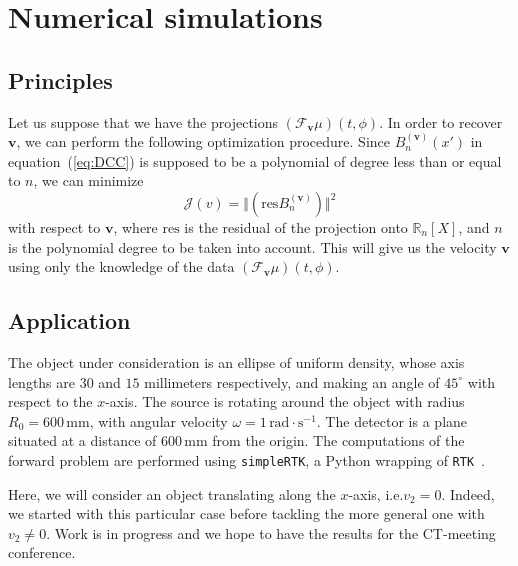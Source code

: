 \documentclass[twocolumn]{IEEEtran}
\newcommand{\R}{\mathbb{R}}
\newcommand{\ie}{i.e.}
\newcommand{\bv}{\mathbf{v}}
\newcommand{\Tbv}{\mathcal{F}_{\mathbf{v}}}
\newcommand{\Bnv}{B_n^{(\bv)}}
\begin{document}
\section{Numerical simulations}

\subsection{Principles}
\label{sub:principles}
Let us suppose that we have the projections $\left( \Tbv \mu \right)(t,\phi)$. In order to recover $\bv$, we can perform the following optimization procedure. Since $\Bnv(x')$ in equation~(\ref{eq:DCC}) is supposed to be a polynomial of degree less than or equal to $n$, we can minimize
\begin{equation}
	\mathcal{J}(v) = \Vert \left( \textrm{res} \Bnv \right) \Vert^2
\label{eq:Jv}
\end{equation}
with respect to $\bv$, where $\textrm{res}$ is the residual of the projection onto $\R_n[X]$, and $n$ is the polynomial degree to be taken into account. This will give us the velocity $\bv$ using only the knowledge of the data $\left( \Tbv \mu \right)(t,\phi)$.

\subsection{Application}
\label{sub:application}

The object under consideration is an ellipse of uniform density, whose axis lengths are $30$ and $15$ millimeters respectively, and making an angle of $45^{\circ}$ with respect to the $x$-axis. The source is rotating around the object with radius $R_0 = 600 \, \textrm{mm}$, with angular velocity $\omega = 1 \, \textrm{rad} \cdot \textrm{s}^{-1}$. The detector is a plane situated at a distance of $600 \, \textrm{mm}$ from the origin. The computations of the forward problem are performed using \verb+simpleRTK+, a Python wrapping of \verb+RTK+~\cite{RTK}.

Here, we will consider an object translating along the $x$-axis, \ie $v_2=0$. Indeed, we started with this particular case before tackling the more general one with $v_2 \neq 0$. Work is in progress and we hope to have the results for the CT-meeting conference.
\end{document}
